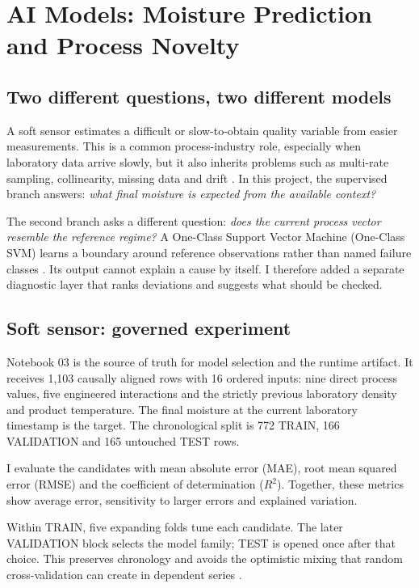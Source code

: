 \chapter{AI Models: Moisture Prediction and Process Novelty}
\label{chap:models}

\section{Two different questions, two different models}

A soft sensor estimates a difficult or slow-to-obtain quality variable from easier measurements. This is a common process-industry role, especially when laboratory data arrive slowly, but it also inherits problems such as multi-rate sampling, collinearity, missing data and drift \cite{kadlec2009}. In this project, the supervised branch answers: \emph{what final moisture is expected from the available context?}

The second branch asks a different question: \emph{does the current process vector resemble the reference regime?} A One-Class Support Vector Machine (One-Class SVM) learns a boundary around reference observations rather than named failure classes \cite{scholkopf2001}. Its output cannot explain a cause by itself. I therefore added a separate diagnostic layer that ranks deviations and suggests what should be checked.

\section{Soft sensor: governed experiment}

Notebook 03 is the source of truth for model selection and the runtime artifact. It receives 1,103 causally aligned rows with 16 ordered inputs: nine direct process values, five engineered interactions and the strictly previous laboratory density and product temperature. The final moisture at the current laboratory timestamp is the target. The chronological split is 772 TRAIN, 166 VALIDATION and 165 untouched TEST rows.

I evaluate the candidates with mean absolute error (MAE), root mean squared error (RMSE) and the coefficient of determination ($R^2$). Together, these metrics show average error, sensitivity to larger errors and explained variation.

Within TRAIN, five expanding  folds tune each candidate. The later VALIDATION block selects the model family; TEST is opened once after that choice. This preserves chronology and avoids the optimistic mixing that random cross-validation can create in dependent series \cite{bergmeir2012}.

